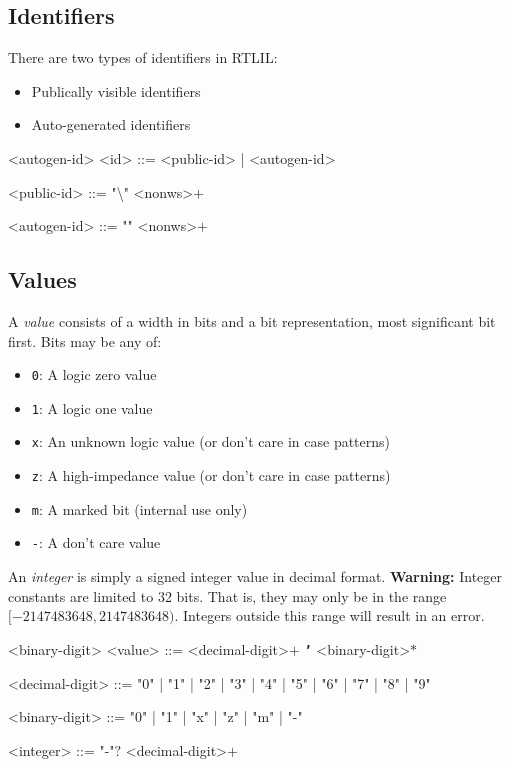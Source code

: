 \subsection{Identifiers}

There are two types of identifiers in RTLIL:

\begin{itemize}
    \item Publically visible identifiers
    \item Auto-generated identifiers
\end{itemize}

\begin{indentgrammar}{<autogen-id>}
<id> ::= <public-id> | <autogen-id>

<public-id> ::= "\textbackslash" <nonws>$+$

<autogen-id> ::= "\textdollar" <nonws>$+$
\end{indentgrammar}

\subsection{Values}

A \textit{value} consists of a width in bits and a bit representation, most significant bit first. Bits may be any of:
\begin{itemize}
    \item \texttt{0}: A logic zero value
    \item \texttt{1}: A logic one value
    \item \texttt{x}: An unknown logic value (or don't care in case patterns)
    \item \texttt{z}: A high-impedance value (or don't care in case patterns)
    \item \texttt{m}: A marked bit (internal use only)
    \item \texttt{-}: A don't care value
\end{itemize}

An \textit{integer} is simply a signed integer value in decimal format. \textbf{Warning:} Integer constants are limited to 32 bits. That is, they may only be in the range $[-2147483648, 2147483648)$. Integers outside this range will result in an error.

\begin{indentgrammar}{<binary-digit>}
<value> ::= <decimal-digit>$+$ \texttt{\textbf{'}} <binary-digit>$*$

<decimal-digit> ::= "0" | "1" | "2" | "3" | "4" | "5" | "6" | "7" | "8" | "9"

<binary-digit> ::= "0" | "1" | "x" | "z" | "m" | "-"

<integer> ::= "-"$?$ <decimal-digit>$+$
\end{indentgrammar}

